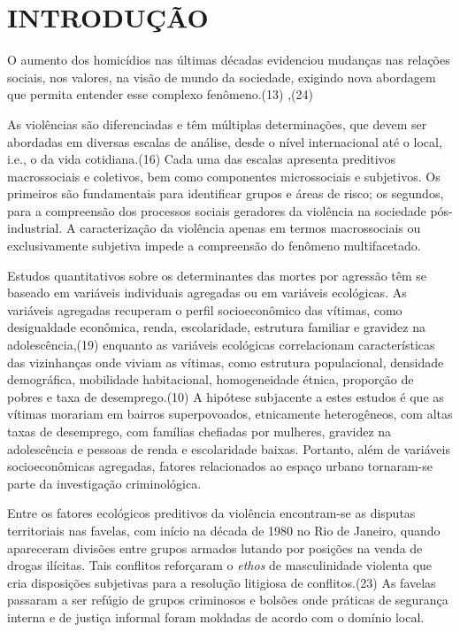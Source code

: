 \documentclass{article}
\begin{document}
\section{INTRODUÇÃO}

O aumento dos homicídios nas últimas décadas evidenciou mudanças nas relações
sociais, nos valores, na visão de mundo da sociedade, exigindo nova abordagem
que permita entender esse complexo fenômeno.(13)
,(24)

As violências são diferenciadas e têm múltiplas determinações, que devem ser
abordadas em diversas escalas de análise, desde o nível internacional até o
local, i.e., o da vida cotidiana.(16)
Cada uma das escalas apresenta preditivos macrossociais e coletivos, bem como
componentes microssociais e subjetivos. Os primeiros são fundamentais para
identificar grupos e áreas de risco; os segundos, para a compreensão dos
processos sociais geradores da violência na sociedade pós-industrial. A
caracterização da violência apenas em termos macrossociais ou exclusivamente
subjetiva impede a compreensão do fenômeno multifacetado.

Estudos quantitativos sobre os determinantes das mortes por agressão têm se
baseado em variáveis individuais agregadas ou em variáveis ecológicas. As
variáveis agregadas recuperam o perfil socioeconômico das vítimas, como
desigualdade econômica, renda, escolaridade, estrutura familiar e gravidez na
adolescência,(19)
enquanto as variáveis ecológicas correlacionam características das vizinhanças
onde viviam as vítimas, como estrutura populacional, densidade demográfica,
mobilidade habitacional, homogeneidade étnica, proporção de pobres e taxa de
desemprego.(10)
A hipótese subjacente a estes estudos é que as vítimas morariam em bairros
superpovoados, etnicamente heterogêneos, com altas taxas de desemprego, com
famílias chefiadas por mulheres, gravidez na adolescência e pessoas de renda e
escolaridade baixas. Portanto, além de variáveis socioeconômicas agregadas,
fatores relacionados ao espaço urbano tornaram-se parte da investigação
criminológica.

Entre os fatores ecológicos preditivos da violência encontram-se as disputas
territoriais nas favelas, com início na década de 1980 no Rio de Janeiro, quando
apareceram divisões entre grupos armados lutando por posições na venda de drogas
ilícitas. Tais conflitos reforçaram o \textit{ethos}
de masculinidade violenta que cria disposições subjetivas para a resolução
litigiosa de conflitos.(23)
As favelas passaram a ser refúgio de grupos criminosos e bolsões onde práticas
de segurança interna e de justiça informal foram moldadas de acordo com o
domínio local.
\end{document}
